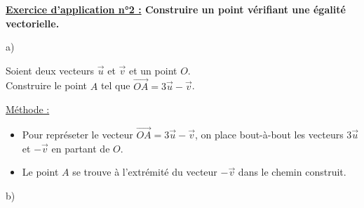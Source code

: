 \documentclass[12pt]{article}
\begin{document}
\begin{mdframed}[
    linewidth=1pt,
    roundcorner=5pt,
    linecolor=RoyalBlue,
    innertopmargin=10pt,
    innerbottommargin=10pt
]
{\color{RoyalBlue}\textbf{\underline{Exercice d'application n°2 :} Construire un point 
vérifiant une égalité vectorielle.}}
\vspace{10pt}

a)\vspace{5pt}\\
\begin{minipage}{.45\textwidth}%
\end{minipage}%
\hfill
\begin{minipage}{.55\textwidth}%
    Soient deux vecteurs $\overrightarrow{u}$ et $\overrightarrow{v}$ et un point $O$.
    \vspace{5pt}\\Construire le point $A$ tel que $\overrightarrow{OA} = 3\overrightarrow{u} - 
    \overrightarrow{v}$.
\end{minipage}%

\vspace{10pt}
\underline{Méthode :}
\vspace{5pt}
\begin{itemize}
    \item Pour représeter le vecteur $\overrightarrow{OA} = 3\overrightarrow{u} - \overrightarrow{v}$, 
    on place bout-à-bout les vecteurs $3\overrightarrow{u}$ et $-\overrightarrow{v}$ en partant 
    de $O$.
    \item Le point $A$ se trouve à l'extrémité du vecteur $-\overrightarrow{v}$ dans le chemin 
    construit.
\end{itemize}

\newpage

b)\vspace{5pt}\\
\begin{minipage}{.45\textwidth}%
    \begin{tikzpicture}[scale=0.5]


\end{tikzpicture}
\end{minipage}
\end{mdframed}
\end{document}
